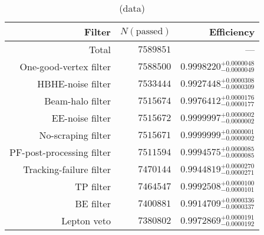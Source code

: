 \begin{table}[!htb]
  \caption{(data) }
  \begin{center}
    \begin{tabular}{rrr}
      \toprule
      Filter    & $N(\text{passed})$ &   Efficiency \\ 
      \midrule
      Total & $   7589851$  & --- \\
      One-good-vertex filter & $   7588500$  & $   0.9998220^{+0.0000048}_{-0.0000049}$ \\
      HBHE-noise filter & $   7533444$  & $   0.9927448^{+0.0000308}_{-0.0000309}$ \\
      Beam-halo filter & $   7515674$  & $   0.9976412^{+0.0000176}_{-0.0000177}$ \\
      EE-noise filter & $   7515672$  & $   0.9999997^{+0.0000002}_{-0.0000002}$ \\
      No-scraping filter & $   7515671$  & $   0.9999999^{+0.0000001}_{-0.0000002}$ \\
      PF-post-processing filter & $   7511594$  & $   0.9994575^{+0.0000085}_{-0.0000085}$ \\
      Tracking-failure filter & $   7470144$  & $   0.9944819^{+0.0000270}_{-0.0000271}$ \\
      TP filter & $   7464547$  & $   0.9992508^{+0.0000100}_{-0.0000101}$ \\
      BE filter & $   7400881$  & $   0.9914709^{+0.0000336}_{-0.0000337}$ \\
      Lepton veto & $   7380802$  & $   0.9972869^{+0.0000191}_{-0.0000192}$ \\
      \bottomrule
    \end{tabular}
  \end{center}
  \label{tab:App:ResCore:CutFlowData}
\end{table}

